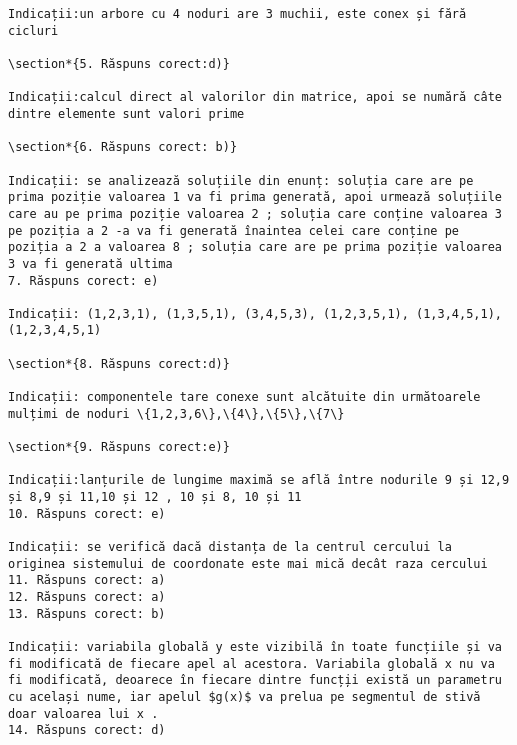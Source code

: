 \begin{verbatim}
Indicații:un arbore cu 4 noduri are 3 muchii, este conex și fără cicluri

\section*{5. Răspuns corect:d)}

Indicații:calcul direct al valorilor din matrice, apoi se numără câte dintre elemente sunt valori prime

\section*{6. Răspuns corect: b)}

Indicații: se analizează soluțiile din enunț: soluția care are pe prima poziție valoarea 1 va fi prima generată, apoi urmează soluțiile care au pe prima poziție valoarea 2 ; soluția care conține valoarea 3 pe poziția a 2 -a va fi generată înaintea celei care conține pe poziția a 2 a valoarea 8 ; soluția care are pe prima poziție valoarea 3 va fi generată ultima
7. Răspuns corect: e)

Indicații: (1,2,3,1), (1,3,5,1), (3,4,5,3), (1,2,3,5,1), (1,3,4,5,1), (1,2,3,4,5,1)

\section*{8. Răspuns corect:d)}

Indicații: componentele tare conexe sunt alcătuite din următoarele mulțimi de noduri \{1,2,3,6\},\{4\},\{5\},\{7\}

\section*{9. Răspuns corect:e)}

Indicații:lanțurile de lungime maximă se află între nodurile 9 și 12,9 și 8,9 și 11,10 și 12 , 10 și 8, 10 și 11
10. Răspuns corect: e)

Indicații: se verifică dacă distanța de la centrul cercului la originea sistemului de coordonate este mai mică decât raza cercului
11. Răspuns corect: a)
12. Răspuns corect: a)
13. Răspuns corect: b)

Indicații: variabila globală y este vizibilă în toate funcțiile și va fi modificată de fiecare apel al acestora. Variabila globală x nu va fi modificată, deoarece în fiecare dintre funcț̦ii există un parametru cu același nume, iar apelul $g(x)$ va prelua pe segmentul de stivă doar valoarea lui x .
14. Răspuns corect: d)


\end{verbatim}
